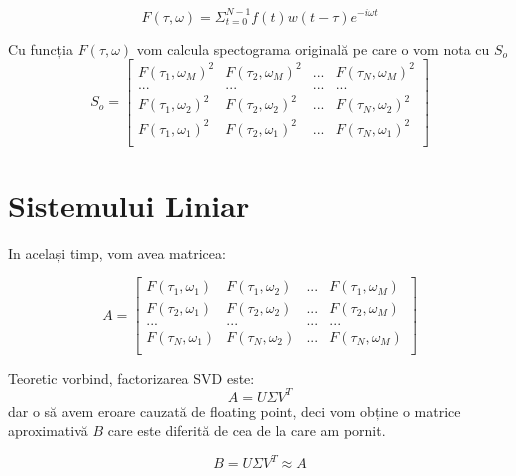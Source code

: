 \documentclass[english]{article}
\begin{document}
\begin{equation}
    F(\tau,\omega) = \Sigma_{t=0}^{N-1} f(t) w(t-\tau) e^{-i\omega t}
\end{equation}

Cu funcția $F(\tau,\omega)$ vom calcula spectograma originală pe care o vom nota cu $S_{o}$\\

\begin{equation}
	S_{o} = \begin{bmatrix}
		F(\tau_{1},\omega_{M})^{2} & F(\tau_{2},\omega_{M})^{2} & ... & F(\tau_{N},\omega_{M})^{2} \\
        ... & ... & ... & ... \\
		F(\tau_{1},\omega_{2})^{2} & F(\tau_{2},\omega_{2})^{2} & ... & F(\tau_{N},\omega_{2})^{2} \\
        F(\tau_{1},\omega_{1})^{2} & F(\tau_{2},\omega_{1})^{2} & ... & F(\tau_{N},\omega_{1})^{2} \\
	\end{bmatrix}
\end{equation}

\section{Sistemului Liniar}\label{Modelul}

In același timp, vom avea matricea:

\begin{equation}
	A = \begin{bmatrix}
		F(\tau_{1},\omega_{1}) & F(\tau_{1},\omega_{2}) & ... & F(\tau_{1},\omega_{M}) \\
        F(\tau_{2},\omega_{1}) & F(\tau_{2},\omega_{2}) & ... & F(\tau_{2},\omega_{M}) \\
        ... & ... & ... & ... \\
        F(\tau_{N},\omega_{1}) & F(\tau_{N},\omega_{2}) & ... & F(\tau_{N},\omega_{M}) \\
	\end{bmatrix}
\end{equation}

Teoretic vorbind, factorizarea SVD este:
\begin{equation}
    A = U \Sigma V^T
\end{equation}
 dar o să avem eroare cauzată de floating point, deci vom obține o matrice aproximativă $B$ care este diferită de cea de la care am pornit.

\begin{equation}
    B = U \Sigma V^T \approx A
\end{equation}
\end{document}
